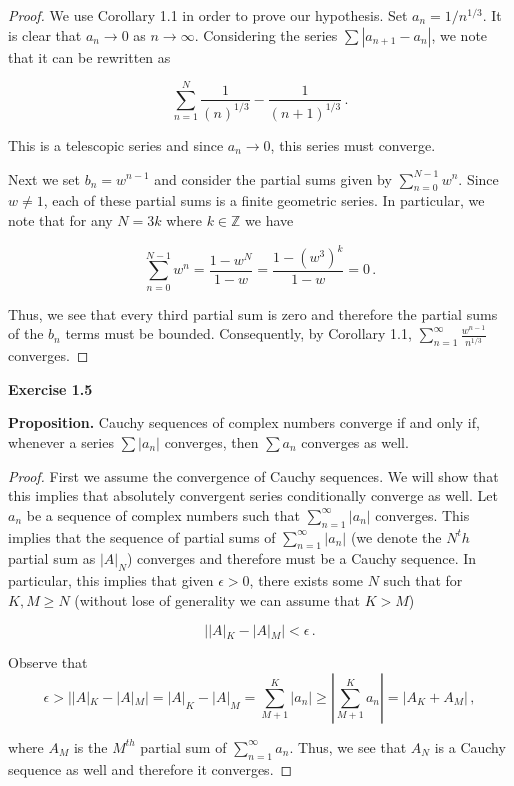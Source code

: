 \documentclass[a4paper]{article}
\newcommand {\pro} {\textbf{Proposition. }}
\numberwithin{equation}{section}
\begin{document}
\begin{description}
	\begin{proof} We use Corollary 1.1 in order to prove our hypothesis. Set $a_n = 1/n^{1/3}$. It is clear that $a_n \rightarrow 0$ as $n \rightarrow \infty$. Considering the series $\sum |a_{n+1} - a_n|$, we note that it can be rewritten as 
	
	$$\sum_{n=1}^N \frac{1}{(n)^{1/3}} - \frac{1}{(n+1)^{1/3}}\,.$$
	
	This is a telescopic series and since $a_n \rightarrow 0$, this series must converge.
	
	Next we set $b_n = w^{n-1}$ and consider the partial sums given by $\sum_{n=0}^{N-1} w^n$. Since $w \neq 1$, each of these partial sums is a finite geometric series. In particular, we note that for any $N = 3k$ where $k \in \mathbb{Z}$ we have
	
	$$\sum_{n=0}^{N-1} w^n = \frac{1-w^N}{1-w} = \frac{1-{(w^3)}^k}{1-w} = 0\,.$$
	
	Thus, we see that every third partial sum is zero and therefore the partial sums of the $b_n$ terms must be bounded. Consequently, by Corollary 1.1, $\sum \limits_{n=1}^\infty \frac{w^{n-1}}{n^{1/3}}$ converges.
	
	\end{proof}

\item \textbf{Exercise 1.5} 

\pro Cauchy sequences of complex numbers converge if and only if, whenever a series $\sum |a_n|$ converges, then $\sum a_n$ converges as well.

\begin{proof} First we assume the convergence of Cauchy sequences. We will show that this implies that absolutely convergent series conditionally converge as well. Let ${a_n}$ be a sequence of complex numbers such that $\sum_{n=1}^\infty |a_n|$ converges. This implies that the sequence of partial sums of $\sum_{n=1}^\infty |a_n|$ (we denote the $N^th$ partial sum as $|A|_N$) converges and therefore must be a Cauchy sequence. In particular, this implies that given $\epsilon > 0$, there exists some $N$ such that for $K,M \geq N$ (without lose of generality we can assume that $K > M$) 

	$$||A|_K - |A|_M| < \epsilon\,.$$
	
	Observe that 
	$$\epsilon > ||A|_K - |A|_M| = |A|_K - |A|_M = \sum_{M+1}^K |a_n| \geq |\sum_{M+1}^K a_n| = |A_K +A_M|\,,$$
	
	where $A_M$ is the $M^{th}$ partial sum of $\sum_{n=1}^\infty a_n$. Thus, we see that ${A_N}$ is a Cauchy sequence as well and therefore it converges. 


\end{proof}
\end{description}
\end{document}
